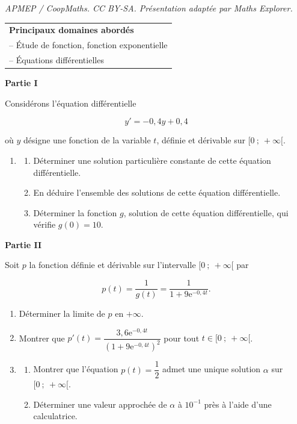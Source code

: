 \documentclass[10pt]{article}
\providecommand{\e}{{\mathrm{e}}}
\begin{document}
\noindent\textit{APMEP / CoopMaths. CC BY-SA. Présentation adaptée par Maths Explorer.}\par\medskip
\medskip

\begin{tabular}{|l|}\hline
\textbf{Principaux domaines abordés}\\
-- Étude de fonction, fonction exponentielle\\
-- Équations différentielles\\ \hline
\end{tabular}

\bigskip

\textbf{Partie I}

\medskip

Considérons l'équation différentielle

\[y'= -0,4y + 0,4\]

où $y$ désigne une fonction de la variable $t$, définie et dérivable sur $[0~;~ + \infty[$.

\medskip

\begin{enumerate}
\item 
	\begin{enumerate}
		\item Déterminer une solution particulière constante de cette équation différentielle. 
		\item En déduire l'ensemble des solutions de cette équation différentielle.
\item Déterminer la fonction $g$, solution de cette équation différentielle, qui vérifie $g(0) = 10$.
	\end{enumerate}
\end{enumerate}

\bigskip

\textbf{Partie II}

\medskip

Soit $p$ la fonction définie et dérivable sur l'intervalle $[0~;~+ \infty[$ par 

\[p(t) = \dfrac{1}{g(t)} = \dfrac{1}{1 + 9\e^{-0,4t}}.\]

\smallskip

\begin{enumerate}
\item Déterminer la limite de $p$ en $+ \infty$. 
\item Montrer que $p'(t) = \dfrac{3,6\e^{-0,4t}}{ \left(1 + 9\e^{-0,4t}\right)^2}$ pour tout $t \in  [0~;~+ \infty[$.

\item  
	\begin{enumerate}
		\item Montrer que l'équation $p(t) = \dfrac{1}{2}$ admet une unique solution $\alpha$ sur $[0~;~+ \infty[$. 
		\item Déterminer une valeur approchée de $\alpha$ à $10^{-1}$ près à l'aide d'une calculatrice.
	\end{enumerate}
\end{enumerate}
\end{document}
